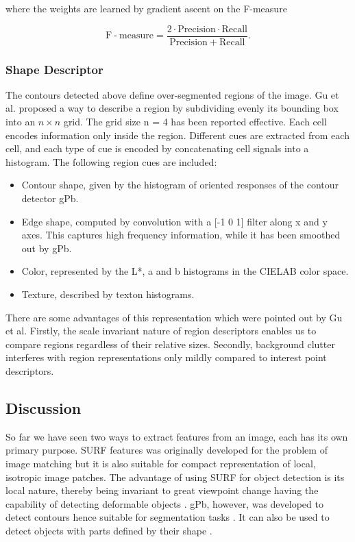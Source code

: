 \documentclass{SMBV12}
\begin{document}
where the weights are learned by gradient ascent on the F-measure

\begin{equation}
\mathrm{F} \operatorname{-} \mathrm{measure} = \dfrac{2\cdot \mathrm{Precision} \cdot \mathrm{Recall}}{\mathrm{Precision + Recall}}.
\end{equation} 

\subsubsection{Shape Descriptor}
\label{sec:shape_descriptor}

The contours detected above define over-segmented regions of the image. Gu et al. \cite{gu2009recognition} proposed a way to describe a region by subdividing evenly its bounding box into an $n \times n$ grid. The grid size n = 4 has been reported effective. Each cell encodes information only inside the region. Different cues are extracted from each cell, and each type of cue is encoded by concatenating cell signals into a histogram. The following region cues are included:

\begin{itemize}
\item Contour shape, given by the histogram of oriented responses of the contour detector gPb.
\item Edge shape, computed by convolution with a [-1 0 1] filter along x and y axes. This captures high frequency information, while it has been smoothed out by gPb.
\item Color, represented by the L*, a and b histograms in the CIELAB color space.
\item Texture, described by texton histograms.
\end{itemize}

There are some advantages of this representation which were pointed out by Gu et al. Firstly, the scale invariant nature of region descriptors enables us to compare regions regardless of their relative sizes. Secondly, background clutter interferes with region representations only mildly compared to interest point descriptors.


\subsection{Discussion}

So far we have seen two ways to extract features from an image, each has its own primary purpose. SURF features was originally developed for the problem of image matching but it is also suitable for compact representation of local, isotropic image patches. The advantage of using SURF for object detection is its local nature, thereby being invariant to great viewpoint change having the capability of detecting deformable objects \cite{VijayGrauman2011}. gPb, however, was developed to detect contours hence suitable for segmentation tasks \cite{arbelaez2009contours} \cite{gu2009recognition}. It can also be used to detect objects with parts defined by their shape \cite{VijayGrauman2011} \cite{gu2009recognition}.
\end{document}
